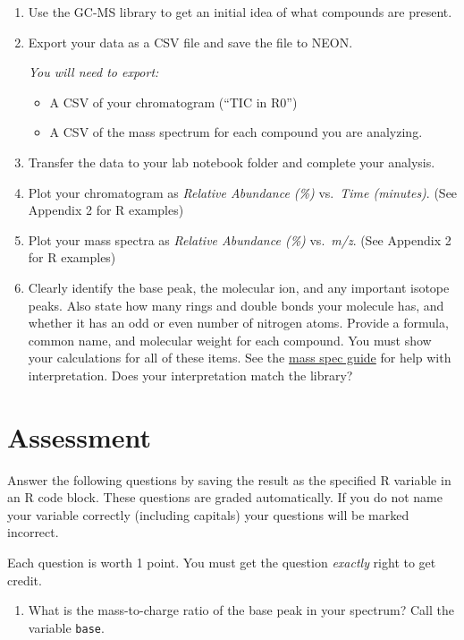 \documentclass[]{tufte-book}
\providecommand{\tightlist}{%
  \setlength{\itemsep}{0pt}\setlength{\parskip}{0pt}}
\begin{document}
\begin{enumerate}
\def\labelenumi{\arabic{enumi}.}
\item
  Use the GC-MS library to get an initial idea of what compounds are present.
\item
  Export your data as a CSV file and save the file to NEON.

  \emph{You will need to export:}

  \begin{itemize}
  \tightlist
  \item
    A CSV of your chromatogram (``TIC in R0'')\\
  \item
    A CSV of the mass spectrum for each compound you are analyzing.
  \end{itemize}
\item
  Transfer the data to your lab notebook folder and complete your analysis.
\item
  Plot your chromatogram as \emph{Relative Abundance (\%)} vs.~\emph{Time (minutes)}. (See Appendix 2 for R examples)
\item
  Plot your mass spectra as \emph{Relative Abundance (\%)} vs.~\emph{m/z}. (See Appendix 2 for R examples)
\item
  Clearly identify the base peak, the molecular ion, and any important isotope peaks. Also state how many rings and double bonds your molecule has, and whether it has an odd or even number of nitrogen atoms. Provide a formula, common name, and molecular weight for each compound. You must show your calculations for all of these items. See the \href{/chem370/guides/mass-spec}{mass spec guide} for help with interpretation. Does your interpretation match the library?
\end{enumerate}

\hypertarget{am-gc-assessment}{%
\section{Assessment}\label{am-gc-assessment}}

Answer the following questions by saving the result as the specified R variable in an R code block. These questions are graded automatically. If you do not name your variable correctly (including capitals) your questions will be marked incorrect.

Each question is worth 1 point. You must get the question \emph{exactly} right to get credit.

\begin{enumerate}
\def\labelenumi{\arabic{enumi}.}
\tightlist
\item
  What is the mass-to-charge ratio of the base peak in your spectrum? Call the variable \texttt{base}.
\end{enumerate}
\end{document}
